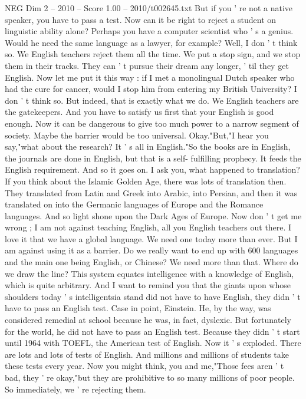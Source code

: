\begin{textsample}{NEG Dim 2 – 2010 – Score 1.00 – 2010/t002645.txt}
But if you ' re not a native speaker, you have to pass a test.
Now can it be right to reject a student on linguistic ability alone?
Perhaps you have a computer scientist who ' s a genius.
Would he need the same language as a lawyer, for example?
Well, I don ' t think so.
We English teachers reject them all the time.
We put a stop sign, and we stop them in their tracks.
They can ' t pursue their dream any longer, ' til they get English.
Now let me put it this way : if I met a monolingual Dutch speaker who had the cure for cancer, would I stop him from entering my British University?
I don ' t think so.
But indeed, that is exactly what we do.
We English teachers are the gatekeepers.
And you have to satisfy us first that your English is good enough.
Now it can be dangerous to give too much power to a narrow segment of society.
Maybe the barrier would be too universal.
Okay."But,"I hear you say,"what about the research?
It ' s all in English."So the books are in English, the journals are done in English, but that is a self- fulfilling prophecy.
It feeds the English requirement.
And so it goes on.
I ask you, what happened to translation?
If you think about the Islamic Golden Age, there was lots of translation then.
They translated from Latin and Greek into Arabic, into Persian, and then it was translated on into the Germanic languages of Europe and the Romance languages.
And so light shone upon the Dark Ages of Europe.
Now don ' t get me wrong ; I am not against teaching English, all you English teachers out there.
I love it that we have a global language.
We need one today more than ever.
But I am against using it as a barrier.
Do we really want to end up with 600 languages and the main one being English, or Chinese?
We need more than that.
Where do we draw the line?
This system equates intelligence with a knowledge of English, which is quite arbitrary.
And I want to remind you that the giants upon whose shoulders today ' s intelligentsia stand did not have to have English, they didn ' t have to pass an English test.
Case in point, Einstein.
He, by the way, was considered remedial at school because he was, in fact, dyslexic.
But fortunately for the world, he did not have to pass an English test.
Because they didn ' t start until 1964 with TOEFL, the American test of English.
Now it ' s exploded.
There are lots and lots of tests of English.
And millions and millions of students take these tests every year.
Now you might think, you and me,"Those fees aren ' t bad, they ' re okay,"but they are prohibitive to so many millions of poor people.
So immediately, we ' re rejecting them.

\end{textsample}
